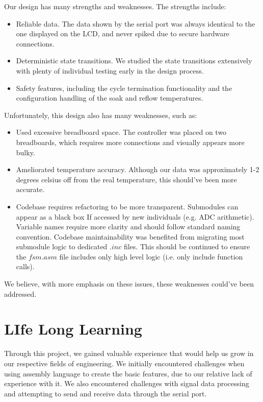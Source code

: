 \documentclass{article}
\begin{document}
\noindent Our design has many strengths and weaknesses. The strengths include:
\begin{itemize}
    \item Reliable data. The data shown by the serial port was always identical to the one displayed on the LCD, and never spiked due to secure hardware connections.
    \item Deterministic state transitions. We studied the state transitions extensively with plenty of individual testing early in the design process.
    \item Safety features, including the cycle termination functionality and the configuration handling of the soak and reflow temperatures.
\end{itemize}
Unfortunately, this design also has many weaknesses, such as:
\begin{itemize}
    \item Used excessive breadboard space. The controller was placed on two breadboards, which requires more connections and visually appears more bulky.
    \item Ameliorated temperature accuracy. Although our data was approximately 1-2 degrees celsius off from the real temperature, this should've been more accurate.
    \item Codebase requires refactoring to be more transparent. Submodules can appear as a black box If accessed by new individuals (e.g. ADC arithmetic). Variable names require more clarity and should follow standard naming convention. Codebase maintainability was benefited from migrating most submodule logic to dedicated $.inc$ files. This should be continued to ensure the $fsm.asm$ file includes only high level logic (i.e. only include function calls).
\end{itemize}

\noindent We believe, with more emphasis on these issues, these weaknesses could've been addressed.

\section{LIfe Long Learning}
Through this project, we gained valuable experience that would help us grow in our respective fields of engineering. We initially encountered challenges when using assembly language to create the basic features, due to our relative lack of experience with it. We also encountered challenges with signal data processing and attempting to send and receive data through the serial port.
\end{document}
